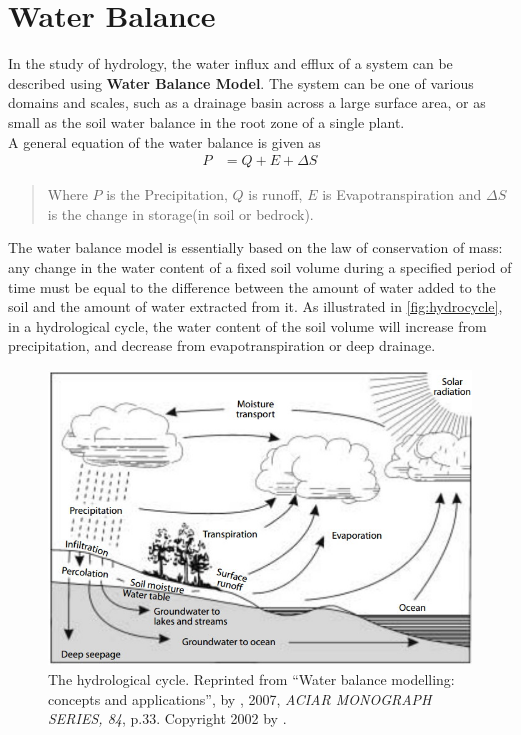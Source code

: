 
\chapter{Water Balance} %

\label{ch:WaterBalance} %

In the study of hydrology, the water influx and efflux of a system can be described using \textbf{Water Balance Model}. The system can be one of various domains and scales, such as a drainage basin across a large surface area\citep{Kirby2008}, or as small as the soil water balance in the root zone of a single plant\citep{Zhang2002}.\\
\newline
A general equation of the water balance is given as
\begin{align}
P&=Q+E+\Delta S\label{eq:generalwaterbalance}
\end{align}
\begin{quote}Where $P$ is the Precipitation, $Q$ is runoff, $E$ is Evapotranspiration and $\Delta S$ is the change in storage(in soil or bedrock).
\end{quote}
The water balance model is essentially based on the law of conservation of mass: any change in the water content of a fixed soil volume during a specified period of time must be equal to the difference between the amount of water added to the soil and the amount of water extracted from it. As illustrated in \autoref{fig:hydrocycle}, in a hydrological cycle, the water content of the soil volume will increase from precipitation, and decrease from evapotranspiration or deep drainage.
\begin{figure}[bth]
\begin{center}
\includegraphics[width=.85\linewidth]{gfx/hydrocycle}
\end{center}
\caption{The hydrological cycle\citep{Zhang2002}. Reprinted from ``Water balance modelling: concepts and applications'', by \citeauthor{Zhang2002}, 2007, \emph{ACIAR MONOGRAPH SERIES, 84}, p.33. Copyright 2002 by \citeauthor{Zhang2002}.  }
\label{fig:hydrocycle}
\end{figure}
